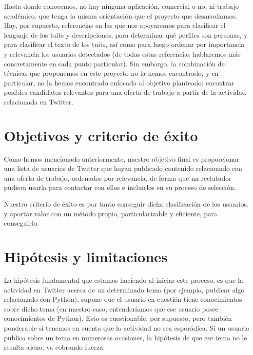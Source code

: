 Hasta donde conocemos, no hay ninguna aplicación, comercial o no, 
ni trabajo académico, que tenga la misma orientación que el proyecto 
que desarrollamos. Hay, por supuesto, referencias en las que nos apoyaremos
para clasificar el lenguaje de los tuits y descripciones, para determinar qué perfiles
son personas, y para clasificar el texto de los tuits, así como para luego ordenar
por importancia y relevancia los usuarios detectados (de todas estas referencias hablaremos
más concretamente en cada punto particular). Sin embargo, 
la combinación de técnicas que proponemos en este proyecto no la hemos encontrado,
y en particular, no la hemos encontrado enfocada al objetivo planteado: encontrar
posibles candidatos relevantes para una oferta de trabajo a partir de
la actividad relacionada en Twitter.



\section{Objetivos y criterio de éxito}
Como hemos mencionado anteriormente, nuestro objetivo final es proporcionar una lista de usuarios de Twitter que hayan publicado contenido relacionado con una oferta de trabajo, ordenados por relevancia, de forma que un reclutador pudiera usarla para contactar con ellos e incluirlos en su proceso de selección.

Nuestro criterio de éxito es por tanto conseguir dicha clasificación de los usuarios,
y aportar valor con un método propio, particularizable y eficiente, para conseguirlo. 

\section{Hip\'otesis y limitaciones}
La hipótesis fundamental que estamos haciendo al iniciar este proceso, es que la actividad en Twitter
acerca de un determinado tema (por ejemplo, publicar algo relacionado con Python), supone
que el usuario en cuestión tiene conocimientos sobre dicho tema (en nuestro caso, entenderíamos que ese
usuario posee conocimientos de Python). Esto es cuestionable, por supuesto, pero también ponderable
si tenemos en cuenta que la actividad no sea esporádica. Si un usuario publica sobre un tema
en numerosas ocasiones, la hipótesis de que ese tema no le resulta ajeno, va cobrando fuerza.

